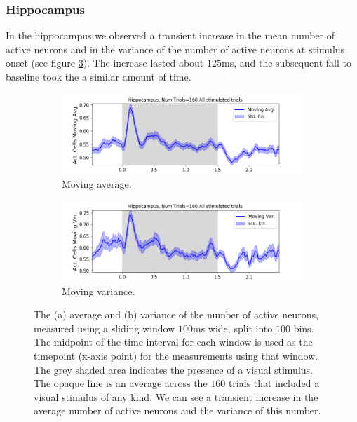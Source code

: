 \documentclass[a4paper,12pt]{article}
\theoremstyle{definition}
\begin{document}
    \newpage

    \subsubsection{Hippocampus}
    In the hippocampus we observed a transient increase in the mean number of active neurons and in the variance of the number of active neurons at stimulus onset (see figure \ref{fig:hippocampus_moving_avg_and_var}). The increase lasted about $125$ms, and the subsequent fall to baseline took the a similar amount of time.

    \begin{figure}[h]
      \begin{subfigure}[h]{\linewidth}
        \includegraphics[width=\linewidth]{figures/hippocampus_1ms_moving_avg_all_stimulated_trials.png}
        \caption{Moving average.}
        \label{fig:hippocampus_moving_avg_num_active_cells}
      \end{subfigure}
      \begin{subfigure}[h]{\linewidth}
        \includegraphics[width=\linewidth]{figures/hippocampus_1ms_moving_var_all_stimulated_trials.png}
        \caption{Moving variance.}
        \label{fig:hippocampus_moving_var_num_active_cells}
      \end{subfigure}
      \caption{The (a) average and (b) variance of the number of active neurons, measured using a sliding window $100$ms wide, split into $100$ bins. The midpoint of the time interval for each window is used as the timepoint (x-axis point) for the measurements using that window. The grey shaded area indicates the presence of a visual stimulus. The opaque line is an average across the $160$ trials that included a visual stimulus of any kind. We can see a transient increase in the average number of active neurons and the variance of this number.}
      \label{fig:hippocampus_moving_avg_and_var}
    \end{figure}
\end{document}
